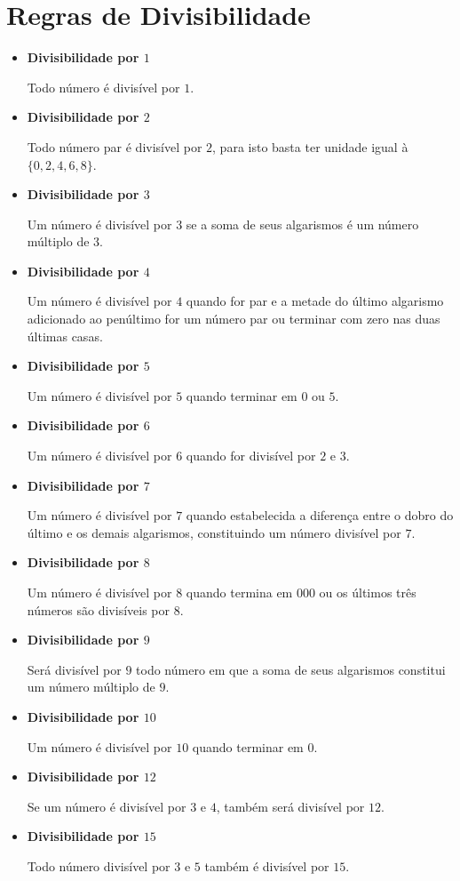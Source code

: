  \newpage
 \section{Regras de Divisibilidade}
 \begin{itemize}
  \item \textbf{Divisibilidade por $1$}
 
 Todo número é divisível por $1$.
 
 \item \textbf{Divisibilidade por $2$}
 
 Todo número par é divisível por $2$, para isto basta ter unidade igual à $\{0, 2, 4, 6, 8\}$.
 
 \item \textbf{Divisibilidade por $3$}
 
 Um número é divisível por $3$ se a soma de seus algarismos é um número múltiplo de $3$.
 
 \item \textbf{Divisibilidade por $4$}
 
 Um número é divisível por $4$ quando for par e a metade do último algarismo adicionado ao penúltimo for um número par ou terminar com zero nas duas últimas casas.
 
 \item \textbf{Divisibilidade por $5$}
 
 Um número é divisível por $5$ quando terminar em $0$ ou $5$.
 
 \item \textbf{Divisibilidade por $6$}
 
 Um número é divisível por $6$ quando for divisível por $2$ e $3$.
 
 \item \textbf{Divisibilidade por $7$}
 
 Um número é divisível por $7$ quando estabelecida a diferença entre o dobro do último e os demais algarismos, constituindo um número divisível por $7$.
 
 \item \textbf{Divisibilidade por $8$}
 
 Um número é divisível por $8$ quando termina em $000$ ou os últimos três números são divisíveis por $8$.
 
 \item \textbf{Divisibilidade por $9$}
 
 Será divisível por $9$ todo número em que a soma de seus algarismos constitui um número múltiplo de $9$.
 
 \item \textbf{Divisibilidade por $10$}
 
 Um número é divisível por $10$ quando terminar em $0$.
 
 \item \textbf{Divisibilidade por $12$}
 
 Se um número é divisível por $3$ e $4$, também será divisível por $12$.
 
 \item \textbf{Divisibilidade por $15$}
 
 Todo número divisível por $3$ e $5$ também é divisível por $15$.
 \end{itemize}
 

